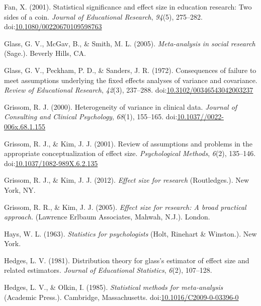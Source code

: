 \documentclass[
  man,floatsintext]{apa6}
\begin{document}
\leavevmode\hypertarget{ref-Fan_2001}{}%
Fan, X. (2001). Statistical significance and effect size in education research: Two sides of a coin. \emph{Journal of Educational Research}, \emph{94}(5), 275--282. doi:\href{https://doi.org/10.1080/00220670109598763}{10.1080/00220670109598763}

\leavevmode\hypertarget{ref-Glass_et_al_1981}{}%
Glass, G. V., McGav, B., \& Smith, M. L. (2005). \emph{Meta-analysis in social research} (Sage.). Beverly Hills, CA.

\leavevmode\hypertarget{ref-Glass_et_al_1972}{}%
Glass, G. V., Peckham, P. D., \& Sanders, J. R. (1972). Consequences of failure to meet assumptions underlying the fixed effects analyses of variance and covariance. \emph{Review of Educational Research}, \emph{42}(3), 237--288. doi:\href{https://doi.org/10.3102/00346543042003237}{10.3102/00346543042003237}

\leavevmode\hypertarget{ref-Grissom_2000}{}%
Grissom, R. J. (2000). Heterogeneity of variance in clinical data. \emph{Journal of Consulting and Clinical Psychology}, \emph{68}(1), 155--165. doi:\href{https://doi.org/10.1037//0022-006x.68.1.155}{10.1037//0022-006x.68.1.155}

\leavevmode\hypertarget{ref-Grissom_Kim_2001}{}%
Grissom, R. J., \& Kim, J. J. (2001). Review of assumptions and problems in the appropriate conceptualization of effect size. \emph{Psychological Methods}, \emph{6}(2), 135--146. doi:\href{https://doi.org/10.1037/1082-989X.6.2.135}{10.1037/1082-989X.6.2.135}

\leavevmode\hypertarget{ref-Grissom_and_Kim_2012}{}%
Grissom, R. J., \& Kim, J. J. (2012). \emph{Effect size for research} (Routledges.). New York, NY.

\leavevmode\hypertarget{ref-Grissom_and_kim_2005}{}%
Grissom, R. R., \& Kim, J. J. (2005). \emph{Effect size for research: A broad practical approach.} (Lawrence Erlbaum Associates, Mahwah, N.J.). London.

\leavevmode\hypertarget{ref-Hays_1963}{}%
Hays, W. L. (1963). \emph{Statistics for psychologists} (Holt, Rinehart \& Winston.). New York.

\leavevmode\hypertarget{ref-Hedges_1981}{}%
Hedges, L. V. (1981). Distribution theory for glass's estimator of effect size and related estimators. \emph{Journal of Educational Statistics}, \emph{6}(2), 107--128.

\leavevmode\hypertarget{ref-Hedges_Olkin_1985}{}%
Hedges, L. V., \& Olkin, I. (1985). \emph{Statistical methods for meta-analysis} (Academic Press.). Cambridge, Massachusetts. doi:\href{https://doi.org/10.1016/C2009-0-03396-0}{10.1016/C2009-0-03396-0}
\end{document}
